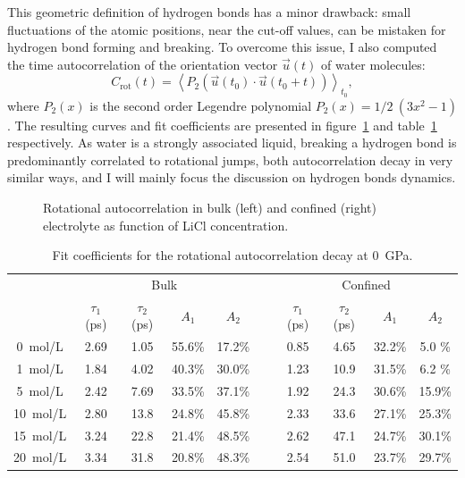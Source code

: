 \documentclass[thesis]{subfiles}
\begin{document}
This geometric definition of hydrogen bonds has a minor drawback: small
fluctuations of the atomic positions, near the cut-off values, can be mistaken
for hydrogen bond forming and breaking. To overcome this issue, I also
computed the time autocorrelation of the orientation vector $\vec u(t)$ of
water molecules:
\[C_{\text{rot}}(t) = \left\langle P_2(\vec u(t_0) \cdot \vec u(t_0 + t)) \right\rangle_{t_0} ,\]
where $P_2(x)$ is the second order Legendre polynomial $P_2(x) = 1/2\ (3x^2 -
1)$\cite{Fogarty2014}. The resulting curves and fit coefficients are presented
in figure~\ref{fig:licl-zif:rotcf} and table~\ref{table:licl-zif:rotcf}
respectively. As water is a strongly associated liquid, breaking a hydrogen bond
is predominantly correlated to rotational jumps, both autocorrelation decay in
very similar ways, and I will mainly focus the discussion on hydrogen bonds
dynamics.

\begin{figure}[ht]
    \centering
    
    \caption{Rotational autocorrelation in bulk (left) and confined (right)
    electrolyte as function of LiCl concentration.}
    \label{fig:licl-zif:rotcf}
\end{figure}

\begin{table}[ht]
    \caption{Fit coefficients for the rotational autocorrelation decay at \SI{0}{GPa}.}
    \label{table:licl-zif:rotcf}
    \centering
    \begin{tabular}{c c c c c c c c c c}
        \toprule
        \multicolumn{1}{c}{~} & \multicolumn{4}{c}{Bulk}                          &~& \multicolumn{4}{c}{Confined} \\
        \multicolumn{1}{c}{~} & $\tau_1$ (ps) & $\tau_2$ (ps) & $A_1$   & $A_2$   &~& $\tau_1$ (ps) & $\tau_2$ (ps) & $A_1$   & $A_2$   \\
        \midrule
        \SI{0}{mol/L}         &    2.69       &    1.05       & 55.6\% & 17.2\% &~&    0.85       &     4.65      &  32.2\% &  5.0  \% \\
        \SI{1}{mol/L}         &    1.84       &    4.02       & 40.3\% & 30.0\% &~&    1.23       &     10.9      &  31.5\% &  6.2  \% \\
        \SI{5}{mol/L}         &    2.42       &    7.69       & 33.5\% & 37.1\% &~&    1.92       &     24.3      &  30.6\% &  15.9\% \\
        \SI{10}{mol/L}        &    2.80       &    13.8       & 24.8\% & 45.8\% &~&    2.33       &     33.6      &  27.1\% &  25.3\% \\
        \SI{15}{mol/L}        &    3.24       &    22.8       & 21.4\% & 48.5\% &~&    2.62       &     47.1      &  24.7\% &  30.1\% \\
        \SI{20}{mol/L}        &    3.34       &    31.8       & 20.8\% & 48.3\% &~&    2.54       &     51.0      &  23.7\% &  29.7\% \\
        \bottomrule
    \end{tabular}
\end{table}
\end{document}
